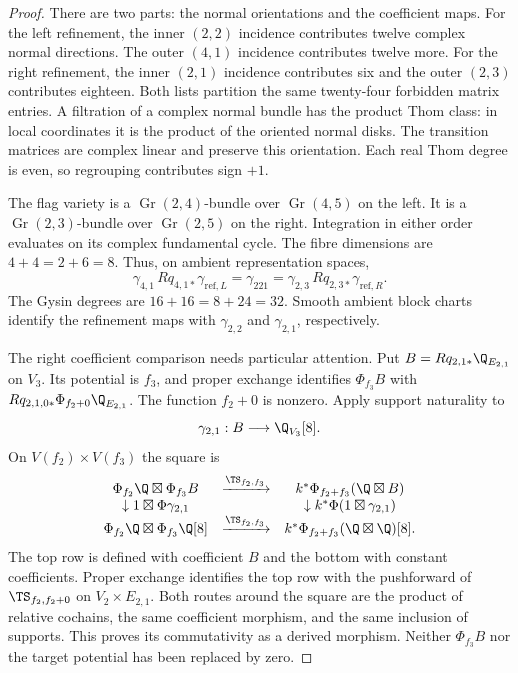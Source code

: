 \begin{proof}
There are two parts: the normal orientations and the coefficient maps.
For the left refinement, the inner $(2,2)$ incidence contributes
twelve complex normal directions. The outer $(4,1)$ incidence
contributes twelve more. For the right refinement, the inner $(2,1)$
incidence contributes six and the outer $(2,3)$ contributes eighteen.
Both lists partition the same twenty-four forbidden matrix entries.
A filtration of a complex normal bundle has the product Thom class:
in local coordinates it is the product of the oriented normal disks.
The transition matrices are complex linear and preserve this orientation.
Each real Thom degree is even, so regrouping contributes sign $+1$.

The flag variety is a $\operatorname{Gr}(2,4)$-bundle over
$\operatorname{Gr}(4,5)$ on the left. It is a
$\operatorname{Gr}(2,3)$-bundle over $\operatorname{Gr}(2,5)$ on
the right. Integration in either order evaluates on its complex
fundamental cycle. The fibre dimensions are $4+4=2+6=8$.
Thus, on ambient representation spaces,
\[
 \gamma_{4,1}\,Rq_{4,1*}\gamma_{\mathrm{ref},L}
       =\gamma_{221}
       =\gamma_{2,3}\,Rq_{2,3*}\gamma_{\mathrm{ref},R}.
\]
The Gysin degrees are $16+16=8+24=32$.
Smooth ambient block charts identify the refinement maps with
$\gamma_{2,2}$ and $\gamma_{2,1}$, respectively.

The right coefficient comparison needs particular attention.
Put $B=Rq_{2,1*}\Q_{E_{2,1}}$ on $V_3$.
Its potential is $f_3$, and proper exchange identifies
$\Phi_{f_3}B$ with $Rq_{2,1,0*}\Phi_{f_2+0}\Q_{E_{2,1}}$.
The function $f_2+0$ is nonzero. Apply support naturality to
\[
                 \gamma_{2,1}:B\longrightarrow\Q_{V_3}[8].
\]
On $V(f_2)\times V(f_3)$ the square is
\[
\begin{array}{ccc}
 \Phi_{f_2}\Q\boxtimes\Phi_{f_3}B
 &\xrightarrow{\TS_{f_2,f_3}}&
 k^*\Phi_{f_2+f_3}(\Q\boxtimes B)\\
 \downarrow1\boxtimes\Phi\gamma_{2,1}&&
 \downarrow k^*\Phi(1\boxtimes\gamma_{2,1})\\
 \Phi_{f_2}\Q\boxtimes\Phi_{f_3}\Q[8]
 &\xrightarrow{\TS_{f_2,f_3}}&
 k^*\Phi_{f_2+f_3}(\Q\boxtimes\Q)[8].
\end{array}
\]
The top row is defined with coefficient $B$ and the bottom with
constant coefficients. Proper exchange identifies the top row with
the pushforward of $\TS_{f_2,f_2+0}$ on $V_2\times E_{2,1}$.
Both routes around the square are the product of relative cochains,
the same coefficient morphism, and the same inclusion of supports.
This proves its commutativity as a derived morphism. Neither
$\Phi_{f_3}B$ nor the target potential has been replaced by zero.


\end{proof}
